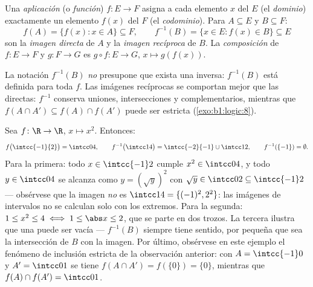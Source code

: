 \begin{definition}\label{def:b1:logic:map}
Una \emph{aplicación} (o \emph{función})
$f \colon E \to F$ asigna a cada elemento $x$ del  $E$ (el
\emph{dominio}) exactamente un elemento $f(x)$ del  $F$ (el
\emph{codominio}). Para $A \subseteq E$ y $B \subseteq F$:
\[
f(A) = \{f(x) : x \in A\} \subseteq F,
\qquad
f^{-1}(B) = \{x \in E : f(x) \in B\} \subseteq E
\]
son la \emph{imagen directa} de $A$ y la \emph{imagen recíproca}
 de $B$. La \emph{composición} de
$f \colon E \to F$ y $g \colon F \to G$ es $g \circ f \colon E \to G$,
$x \mapsto g(f(x))$.
\end{definition}

\begin{remark}
La notación $f^{-1}(B)$ \emph{no} presupone que exista una 
inversa: $f^{-1}(B)$ está definida para toda $f$. Las imágenes
recíprocas se comportan mejor que las directas: $f^{-1}$ conserva
uniones, intersecciones y complementarios, mientras que
$f(A \cap A') \subseteq f(A) \cap f(A')$ puede ser estricta
(\cref{exo:b1:logic:8}).
\end{remark}

\begin{example}\label{ex:b1:logic:images}
Sea $f \colon \R \to \R$, $x \mapsto x^2$. Entonces:
\[
f\bigl(\intcc{-1}{2}\bigr) = \intcc04, \qquad
f^{-1}\bigl(\intcc14\bigr) = \intcc{-2}{-1} \cup \intcc12, \qquad
f^{-1}(\{-1\}) = \emptyset .
\]
Para la primera: todo $x \in \intcc{-1}2$ cumple $x^2 \in \intcc04$, y
todo $y \in \intcc04$ se alcanza como $y = (\sqrt y)^2$ con $\sqrt y
\in \intcc02 \subseteq \intcc{-1}2$ --- obsérvese que la imagen
\emph{no} es $\intcc14 = \{(-1)^2, 2^2\}$: las imágenes de intervalos no
se calculan solo con los extremos. Para la segunda: $1 \leq x^2 \leq 4
\iff 1 \leq \abs x \leq 2$, que se parte en dos trozos. La tercera
ilustra que una  puede ser vacía --- $f^{-1}(B)$
siempre tiene sentido, por pequeña que sea la intersección de $B$ con la
imagen. Por último, obsérvese en este ejemplo el fenómeno de inclusión
estricta de la observación anterior: con $A = \intcc{-1}0$ y
$A' = \intcc01$ se tiene $f(A \cap A') = f(\{0\}) = \{0\}$, mientras que
$f(A) \cap f(A') = \intcc01$.
\end{example}

